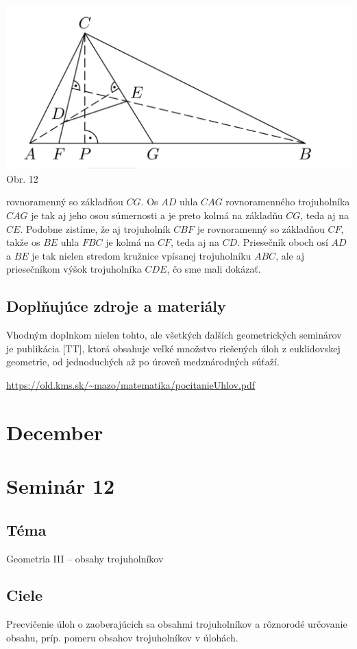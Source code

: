 \documentclass[11pt,a4paper,oneside,final]{book}
\begin{document}
\begin{center}
\includegraphics[scale=0.3]{58K22}\\

Obr. 12
\end{center}
rovnoramenný so základňou $CG$. Os $AD$ uhla $CAG$ rovnoramenného trojuholníka $CAG$ je tak aj jeho osou súmernosti a je preto kolmá na základňu $CG$, teda aj na $CE$. Podobne zistíme, že aj trojuholník $CBF$ je rovnoramenný so základňou $CF$, takže os $BE$ uhla $FBC$ je kolmá na $CF$, teda aj na $CD$. Priesečník oboch osí $AD$ a $BE$ je tak nielen stredom kružnice vpísanej trojuholníku $ABC$, ale aj priesečníkom výšok trojuholníka $CDE$, čo sme mali dokázať.

\subsection*{Doplňujúce zdroje a materiály}
Vhodným doplnkom nielen tohto, ale všetkých ďalších geometrických seminárov je publikácia [TT], ktorá obsahuje veľké množstvo riešených úloh z euklidovskej geometrie, od jednoduchých až po úroveň medznárodných súťaží.

\url{https://old.kms.sk/~mazo/matematika/pocitanieUhlov.pdf}

\newpage
\section{December}
\section*{Seminár 12}
\subsection*{Téma}
Geometria III -- obsahy trojuholníkov

\subsection*{Ciele}
Precvičenie úloh o zaoberajúcich sa obsahmi trojuholníkov a rôznorodé určovanie obsahu, príp. pomeru obsahov trojuholníkov v úlohách.
\end{document}
